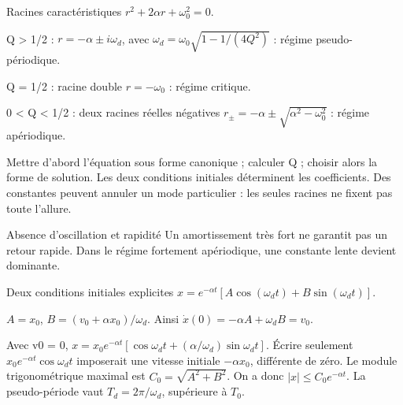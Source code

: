 \begin{loi}{Racines caractéristiques}
$r^2+2\alpha r+\omega_0^2=0$.\par Q > 1/2 : $r=-\alpha\pm i\omega_d$, avec $\omega_d=\omega_0\sqrt{1-1/(4Q^2)}$ : régime pseudo-périodique.\par Q = 1/2 : racine double $r=-\omega_0$ : régime critique.\par 0 < Q < 1/2 : deux racines réelles négatives $r_\pm=-\alpha\pm\sqrt{\alpha^2-\omega_0^2}$ : régime apériodique.
\end{loi}
Mettre d’abord l’équation sous forme canonique ; calculer Q ; choisir alors la forme de solution. Les deux conditions initiales déterminent les coefficients. Des constantes peuvent annuler un mode particulier : les seules racines ne fixent pas toute l’allure.
\begin{piege}{Absence d’oscillation et rapidité}
Un amortissement très fort ne garantit pas un retour rapide. Dans le régime fortement apériodique, une constante lente devient dominante.
\end{piege}


\begin{loi}{Deux conditions initiales explicites}
$x=e^{-\alpha t}[A\cos(\omega_dt)+B\sin(\omega_dt)]$.\par $A=x_0$, $B=(v_0+\alpha x_0)/\omega_d$. Ainsi $\dot x(0)=-\alpha A+\omega_dB=v_0$.
\end{loi}
Avec v0 = 0, $x=x_0e^{-\alpha t}[\cos\omega_dt+(\alpha/\omega_d)\sin\omega_dt]$. Écrire seulement $x_0e^{-\alpha t}\cos\omega_dt$ imposerait une vitesse initiale $-\alpha x_0$, différente de zéro.
Le module trigonométrique maximal est $C_0=\sqrt{A^2+B^2}$. On a donc $|x|\leq C_0e^{-\alpha t}$. La pseudo-période vaut $T_d=2\pi/\omega_d$, supérieure à $T_0$.


